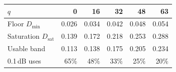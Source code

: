 \begin{tabular}{lrrrrr}
\toprule
$q$ & 0 & 16 & 32 & 48 & 63 \\
\midrule
Floor $D_{\min}$ & 0.026 & 0.034 & 0.042 & 0.048 & 0.054 \\
Saturation $D_{\mathrm{sat}}$ & 0.139 & 0.172 & 0.218 & 0.253 & 0.288 \\
Usable band & 0.113 & 0.138 & 0.175 & 0.205 & 0.234 \\
0.1\,dB uses & 65\% & 48\% & 33\% & 25\% & 20\% \\
\bottomrule
\end{tabular}
